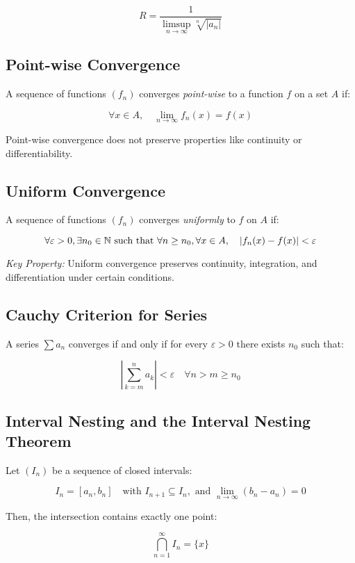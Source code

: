 \[
    R = \frac{1}{\limsup\limits_{n \to \infty} \sqrt[n]{|a_n|}}
\]

\subsection{Point-wise Convergence}

A sequence of functions \((f_n)\) converges \emph{point-wise} to a function \(f\) on a set \(A\) if:

\[
    \forall x \in A, \quad \lim_{n \to \infty} f_n(x) = f(x)
\]

Point-wise convergence does not preserve properties like continuity or differentiability.

\subsection{Uniform Convergence}

A sequence of functions \((f_n)\) converges \emph{uniformly} to \(f\) on \(A\) if:

\[
    \forall \varepsilon > 0, \exists n_0 \in \mathbb{N} \text{ such that } \forall n \ge n_0, \forall x \in A, \quad |f_n(x) - f(x)| < \varepsilon
\]

\emph{Key Property:} Uniform convergence preserves continuity, integration, and differentiation under 
certain conditions.

\subsection{Cauchy Criterion for Series}

A series \(\sum a_n\) converges if and only if for every \(\varepsilon > 0\) there exists \(n_0\) 
such that:

\[
    \left| \sum_{k = m}^{n} a_k \right| < \varepsilon \quad \forall n > m \ge n_0
\]

\subsection{Interval Nesting and the Interval Nesting Theorem}

Let \((I_n)\) be a sequence of closed intervals:

\[
    I_n = [a_n, b_n] \quad \text{with } I_{n+1} \subseteq I_n, \text{ and } \lim_{n \to \infty} (b_n - a_n) = 0
\]

Then, the intersection contains exactly one point:

\[
    \bigcap_{n=1}^{\infty} I_n = \{x\}
\]

